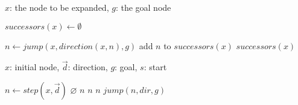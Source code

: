 \begin{algorithm}[b]
\caption{$generateSuccessors$}
\label{alg:successors}
\begin{algorithmic}[1]
\REQUIRE $x$: the node to be expanded, $g$: the goal node 

\STATE $successors(x) \leftarrow \emptyset$

\STATE $n \leftarrow jump(x, direction(x, n), g)$
\STATE add $n$ to $successors(x)$
\ENDFOR
\RETURN $successors(x)$

\end{algorithmic}
\end{algorithm}

\begin{algorithm}[b]
\caption{$jump$}
\label{alg:jump}
\begin{algorithmic}[1]
\REQUIRE $x$: initial node, $\vec{d}$: direction, $g$: goal, $s$: start

\STATE $n \leftarrow step(x, \vec{d})$
	\RETURN $\varnothing$
\ENDIF
{}
	\RETURN $n$
\ENDIF
{}
	\RETURN $n$
\ENDIF
{}
			\RETURN $n$
		\ENDIF
	\ENDFOR
\ENDIF
\RETURN $jump(n, dir, g)$
\end{algorithmic}
\end{algorithm}
